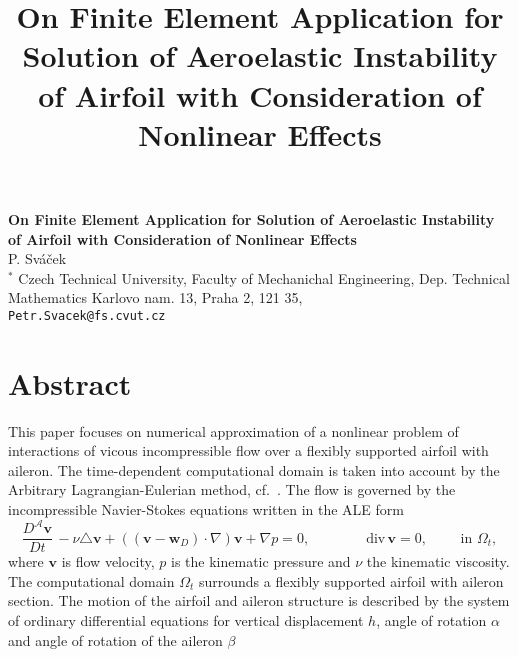 \title{On Finite Element Application for Solution of Aeroelastic Instability of Airfoil with Consideration of Nonlinear Effects}
\author{} \institute{}

\begin{center}

\textbf{\Large On Finite Element Application for Solution of Aeroelastic Instability of Airfoil with Consideration of Nonlinear Effects}\\
\vspace{10mm}
{\large P. Sv\' a\v cek}\\
{$^\ast$ Czech Technical University, Faculty of Mechanichal Engineering, Dep. Technical Mathematics} Karlovo nam. 13, Praha 2, 121 35,\\
{\tt Petr.Svacek@fs.cvut.cz}

\end{center}

\section*{Abstract}

This paper focuses on numerical approximation of a nonlinear problem of interactions of vicous incompressible flow over a flexibly supported airfoil with aileron.
The time-dependent computational domain is taken into account by the Arbitrary Lagrangian-Eulerian method, cf.~\cite{Sva1}. The flow is governed by the incompressible Navier-Stokes equations written in the ALE form 
\begin{equation}
\label{eq:NS}
\frac{D^{\mathcal A} {\mathbf v} }{D t} \, - \nu \triangle {\mathbf v} + (({\mathbf v}-{\mathbf w}_D)\cdot\nabla) {\mathbf v} + \nabla p = 0,  \qquad\qquad
\mbox{div}\, {\mathbf v} = 0, \qquad \mbox{ in } \Omega_t,
\end{equation}
where $\mathbf v$ is flow velocity, $p$ is the kinematic pressure and $\nu$ the kinematic viscosity. The computational domain $\Omega_t$ surrounds a flexibly supported airfoil with aileron section. The motion of the airfoil and aileron structure is described by the system of  ordinary differential equations for vertical displacement $h$, angle of rotation $\alpha$ and angle of rotation of the aileron $\beta$

